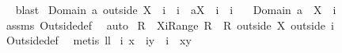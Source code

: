 \begin{isabellebody}
\isadelimproof
\ %
\endisadelimproof
%
\isatagproof
{}\isamarkupfalse%
\ blast%
\endisatagproof
{\isafoldproof}%
%
\isadelimproof
%
\endisadelimproof
\isanewline
\isanewline
{}\isamarkupfalse%
\ {\isachardoublequoteopen}Domain\ {\isacharparenleft}{\isacharparenleft}a\ outside\ {\isacharparenleft}X\ {\isasymunion}\ {\isacharbraceleft}i{\isacharbraceright}{\isacharparenright}{\isacharparenright}\ {\isasymunion}\ {\isacharparenleft}{\isacharbraceleft}{\isacharparenleft}i{\isacharcomma}\ {\isasymUnion}\ {\isacharparenleft}a{\isacharbackquote}{\isacharbackquote}{\isacharparenleft}X\ {\isasymunion}\ {\isacharbraceleft}i{\isacharbraceright}{\isacharparenright}{\isacharparenright}{\isacharparenright}{\isacharbraceright}\ {\isacharminus}\ {\isacharbraceleft}{\isacharparenleft}i{\isacharcomma}{\isacharbraceleft}{\isacharbraceright}{\isacharparenright}{\isacharbraceright}{\isacharparenright}\ {\isacharparenright}\ \isanewline
{\isasymsubseteq}\ Domain\ a\ {\isacharminus}\ X\ {\isasymunion}\ {\isacharbraceleft}i{\isacharbraceright}{\isachardoublequoteclose}%
\isadelimproof
\ %
\endisadelimproof
%
\isatagproof
{}\isamarkupfalse%
\ assms\ Outside{\isacharunderscore}def\ \isamarkupfalse%
\ auto%
\endisatagproof
{\isafoldproof}%
%
\isadelimproof
%
\endisadelimproof
\isanewline
\isanewline
{}\isamarkupfalse%
\ {\isachardoublequoteopen}{\isacharparenleft}R\ {\isacharminus}\ {\isacharparenleft}{\isacharparenleft}X{\isasymunion}{\isacharbraceleft}i{\isacharbraceright}{\isacharparenright}{\isasymtimes}{\isacharparenleft}Range\ R{\isacharparenright}{\isacharparenright}{\isacharparenright}\ {\isacharequal}\ {\isacharparenleft}R\ outside\ X{\isacharparenright}\ outside\ {\isacharbraceleft}i{\isacharbraceright}{\isachardoublequoteclose}%
\isadelimproof
\ %
\endisadelimproof
%
\isatagproof
{}\isamarkupfalse%
\ Outside{\isacharunderscore}def\ \isanewline
{}\isamarkupfalse%
\ {\isacharparenleft}metis\ ll{}{}{\isacharparenright}%
\endisatagproof
{\isafoldproof}%
%
\isadelimproof
%
\endisadelimproof
\isanewline
\isanewline
{}\isamarkupfalse%
\ {\isachardoublequoteopen}{\isacharbraceleft}{\isacharparenleft}i{\isacharcomma}\ x{\isacharparenright}{\isacharbraceright}\ {\isacharminus}\ {\isacharbraceleft}{\isacharparenleft}i{\isacharcomma}y{\isacharparenright}{\isacharbraceright}\ {\isacharequal}\ {\isacharbraceleft}i{\isacharbraceright}\ {\isasymtimes}\ {\isacharparenleft}{\isacharbraceleft}x{\isacharbraceright}{\isacharminus}{\isacharbraceleft}y{\isacharbraceright}{\isacharparenright}{\isachardoublequoteclose}%

\end{isabellebody}
